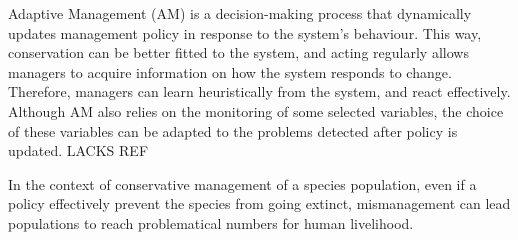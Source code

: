 \documentclass[12pt,a4paper]{article}
\begin{document}
Adaptive Management (AM) is a decision-making process that dynamically updates management policy in response to the system's behaviour.
This way, conservation can be better fitted to the system, and acting regularly allows managers to acquire information on how the system responds to change. %
Therefore, managers can learn heuristically from the system, and react effectively. %
Although AM also relies on the monitoring of some selected variables, the choice of these variables can be adapted to the problems detected after policy is updated. LACKS REF %
%
%
%

In the context of conservative management of a species population, even if a policy effectively prevent the species from going extinct, mismanagement can lead populations to reach problematical numbers for human livelihood. %
\end{document}
